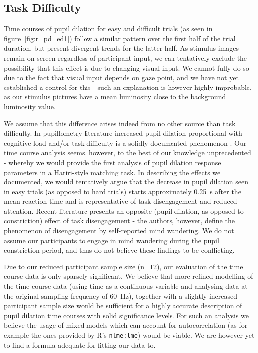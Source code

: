 	\subsection{Task Difficulty}\label{sec:d_pd_td}
	    Time courses of pupil dilation for easy and difficult trials (as seen in figure~\ref{fig:r_pd_ed1}) follow a similar pattern over the first half of the trial duration, but present divergent trends for the latter half.
	    As stimulus images remain on-screen regardless of participant input, we can tentatively exclude the possibility that this effect is due to changing visual input.
	    We cannot fully do so due to the fact that visual input depends on gaze point, and we have not yet established a control for this - such an explanation is however highly improbable, as our stimulus pictures have a mean luminosity close to the background luminosity value.
	    
	    We assume that this difference arises indeed from no other source than task difficulty.   
	    In pupillometry literature increased pupil dilation proportional with cognitive load and/or task difficulty is a solidly documented phenomenon \citep{Piquado2010}.
	    Our time course analysis seems, however, to the best of our knowledge unprecedented - whereby we would provide the first analysis of pupil dilation response parameters in a Hariri-style matching task.
	    In describing the effects we documented, we would tentatively argue that the decrease in pupil dilation seen in easy trials (as opposed to hard trials) starts approximately \SI{0.25}{\second} after the mean reaction time and is representative of task disengagement and reduced attention.
	    Recent literature presents an opposite (pupil dilation, as opposed to constriction) effect of task disengagement \citep{Franklin2013} - the authors, however, define the phenomenon of disengagement by self-reported mind wandering.
	    We do not assume our participants to engage in mind wandering during the pupil constriction period, and thus do not believe these findings to be conflicting.  
	    
	    Due to our reduced participant sample size (n=12), our evaluation of the time course data is only sparsely significant.
	    We believe that more refined modelling of the time course data (using time as a continuous variable and analysing data at the original sampling frequency of \SI{60}{\hertz}), together with a slightly increased participant sample size would be sufficient for a highly accurate description of pupil dilation time courses with solid significance levels.
	    For such an analysis we believe the usage of mixed models which can account for autocorrelation (as for example the ones provided by R's \colorbox{vlg}{\texttt{nlme:lme}}) would be viable.
	    We are however yet to find a formula adequate for fitting our data to.
